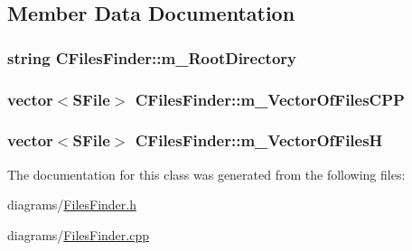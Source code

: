 \subsection{Member Data Documentation}
\hypertarget{class_c_files_finder_a4ed42fa95872f6c774ce1b1672877f96}{
\subsubsection[{m\+\_\+\+Root\+Directory}]{\setlength{\rightskip}{0pt plus 5cm}string C\+Files\+Finder\+::m\+\_\+\+Root\+Directory\hspace{0.3cm}{\ttfamily [private]}}}\label{class_c_files_finder_a4ed42fa95872f6c774ce1b1672877f96}
\hypertarget{class_c_files_finder_a2c6b3e50076b2a5e84a872982fd74f8e}{
\subsubsection[{m\+\_\+\+Vector\+Of\+Files\+C\+P\+P}]{\setlength{\rightskip}{0pt plus 5cm}vector$<${\bf S\+File}$>$ C\+Files\+Finder\+::m\+\_\+\+Vector\+Of\+Files\+C\+P\+P\hspace{0.3cm}{\ttfamily [protected]}}}\label{class_c_files_finder_a2c6b3e50076b2a5e84a872982fd74f8e}
\hypertarget{class_c_files_finder_a2a737438eb2515c0d494b0d4edca3808}{
\subsubsection[{m\+\_\+\+Vector\+Of\+Files\+H}]{\setlength{\rightskip}{0pt plus 5cm}vector$<${\bf S\+File}$>$ C\+Files\+Finder\+::m\+\_\+\+Vector\+Of\+Files\+H\hspace{0.3cm}{\ttfamily [protected]}}}\label{class_c_files_finder_a2a737438eb2515c0d494b0d4edca3808}


The documentation for this class was generated from the following files\+:\begin{DoxyCompactItemize}
\item 
diagrams/\hyperlink{_files_finder_8h}{Files\+Finder.\+h}\item 
diagrams/\hyperlink{_files_finder_8cpp}{Files\+Finder.\+cpp}\end{DoxyCompactItemize}
